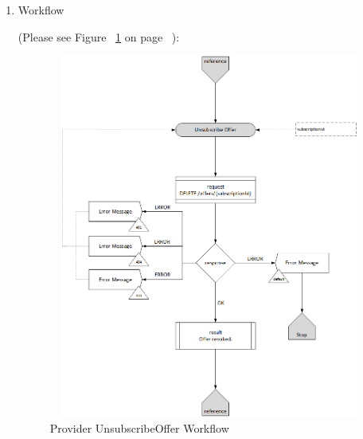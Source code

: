 \begin{enumerate}
\item Workflow

(Please see Figure ~\ref{fig:UsO} on page ~\pageref{fig:UsO}):

\begin{figure}[htbp]
    \centering
    \includegraphics[width=12cm,height=12cm,angle=0]{./diag/Workflow/Market/UnsubscribeOffer-P-Workflow.png}
    \caption{Provider UnsubscribeOffer Workflow}
	\label{fig:UsO}
\end{figure}

\end{enumerate}

\newpage



